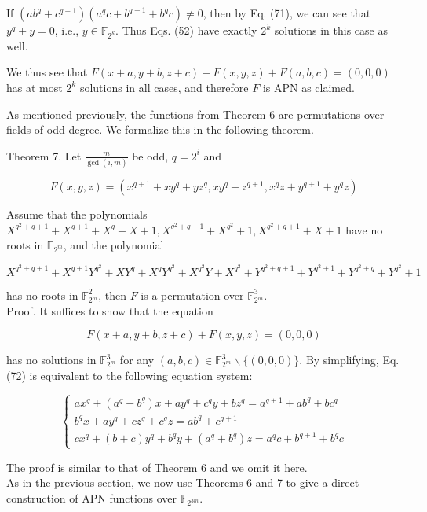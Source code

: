 \documentclass[10pt]{article}
\begin{document}
If $\left(a b^{q}+c^{q+1}\right)\left(a^{q} c+b^{q+1}+b^{q} c\right) \neq 0$, then by Eq. (71), we can see that $y^{q}+y=0$, i.e., $y \in \mathbb{F}_{2^{k}}$. Thus Eqs. (52) have exactly $2^{k}$ solutions in this case as well.

We thus see that $F(x+a, y+b, z+c)+F(x, y, z)+F(a, b, c)=(0,0,0)$ has at most $2^{k}$ solutions in all cases, and therefore $F$ is APN as claimed.

As mentioned previously, the functions from Theorem 6 are permutations over fields of odd degree. We formalize this in the following theorem.

Theorem 7. Let $\frac{m}{\operatorname{gcd}(i, m)}$ be odd, $q=2^{i}$ and

$$
F(x, y, z)=\left(x^{q+1}+x y^{q}+y z^{q}, x y^{q}+z^{q+1}, x^{q} z+y^{q+1}+y^{q} z\right)
$$

Assume that the polynomials $X^{q^{2}+q+1}+X^{q+1}+X^{q}+X+1, X^{q^{2}+q+1}+X^{q^{2}}+1, X^{q^{2}+q+1}+X+1$ have no roots in $\mathbb{F}_{2^{m}}$, and the polynomial

$$
X^{q^{2}+q+1}+X^{q+1} Y^{q^{2}}+X Y^{q}+X^{q} Y^{q^{2}}+X^{q^{2}} Y+X^{q^{2}}+Y^{q^{2}+q+1}+Y^{q^{2}+1}+Y^{q^{2}+q}+Y^{q^{2}}+1
$$

has no roots in $\mathbb{F}_{2^{m}}^{2}$, then $F$ is a permutation over $\mathbb{F}_{2^{m}}^{3}$.\\
Proof. It suffices to show that the equation


\begin{equation*}
F(x+a, y+b, z+c)+F(x, y, z)=(0,0,0) \tag{72}
\end{equation*}


has no solutions in $\mathbb{F}_{2^{m}}^{3}$ for any $(a, b, c) \in \mathbb{F}_{2^{m}}^{3} \backslash\{(0,0,0)\}$. By simplifying, Eq. (72) is equivalent to the following equation system:

\[
\left\{\begin{array}{l}
a x^{q}+\left(a^{q}+b^{q}\right) x+a y^{q}+c^{q} y+b z^{q}=a^{q+1}+a b^{q}+b c^{q}  \tag{73.1}\\
b^{q} x+a y^{q}+c z^{q}+c^{q} z=a b^{q}+c^{q+1} \\
c x^{q}+(b+c) y^{q}+b^{q} y+\left(a^{q}+b^{q}\right) z=a^{q} c+b^{q+1}+b^{q} c
\end{array}\right.
\]

The proof is similar to that of Theorem 6 and we omit it here.\\
As in the previous section, we now use Theorems 6 and 7 to give a direct construction of APN functions over $\mathbb{F}_{2^{3 m}}$.
\end{document}
